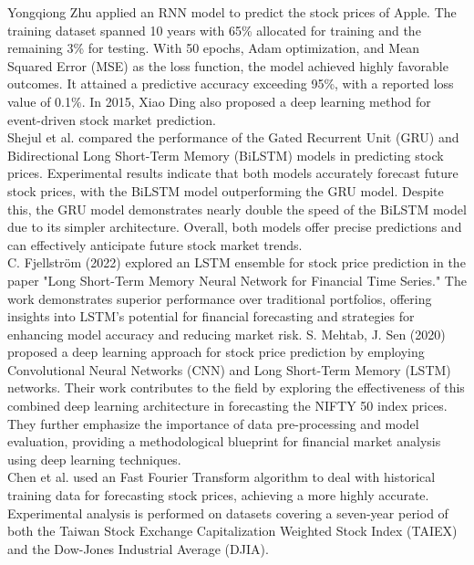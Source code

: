 \documentclass{ieeeojies}
\begin{document}
Yongqiong Zhu \cite{ZhuRNN} applied an RNN model to predict the stock prices of Apple. The training dataset spanned 10 years with 65\% allocated for training and the remaining 3\% for testing. With 50 epochs, Adam optimization, and Mean Squared Error (MSE) as the loss function, the model achieved highly favorable outcomes. It attained a predictive accuracy exceeding 95\%, with a reported loss value of 0.1\%. In 2015, Xiao Ding \cite{DingGRU} also proposed a deep learning method for event-driven stock market prediction.\\

Shejul et al. \cite{ShejulGRU} compared the performance of the Gated Recurrent Unit (GRU) and Bidirectional Long Short-Term Memory (BiLSTM) models in predicting stock prices. Experimental results indicate that both models accurately forecast future stock prices, with the BiLSTM model outperforming the GRU model. Despite this, the GRU model demonstrates nearly double the speed of the BiLSTM model due to its simpler architecture. Overall, both models offer precise predictions and can effectively anticipate future stock market trends.\\

C. Fjellström (2022) \cite{fjellstrom2022lstm} explored an LSTM ensemble for stock price prediction in the paper "Long Short-Term Memory Neural Network for Financial Time Series." The work demonstrates superior performance over traditional portfolios, offering insights into LSTM's potential for financial forecasting and strategies for enhancing model accuracy and reducing market risk. S. Mehtab, J. Sen (2020) \cite{mehtab2020stock} proposed a deep learning approach for stock price prediction by employing Convolutional Neural Networks (CNN) and Long Short-Term Memory (LSTM) networks. Their work contributes to the field by exploring the effectiveness of this combined deep learning architecture in forecasting the NIFTY 50 index prices. They further emphasize the importance of data pre-processing and model evaluation, providing a methodological blueprint for financial market analysis using deep learning techniques.\\

Chen et al.\cite{ChenFFT} used an Fast Fourier Transform algorithm to deal with historical training data for forecasting stock prices, achieving a more highly accurate. Experimental analysis is performed on datasets covering a seven-year period of both the Taiwan Stock Exchange Capitalization Weighted Stock Index (TAIEX) and the Dow-Jones Industrial Average (DJIA). \\
\end{document}
